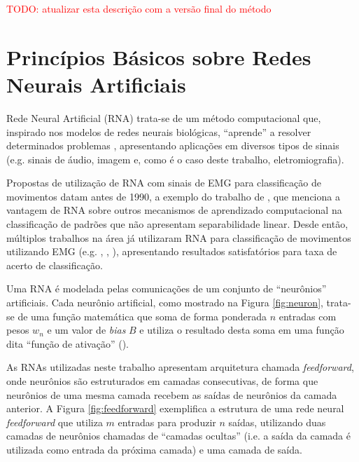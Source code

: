 

\textcolor{red}{TODO: atualizar esta descrição com a versão final do método}

		\section{Princípios Básicos sobre Redes Neurais Artificiais}
Rede Neural Artificial (RNA) trata-se de um método computacional que, inspirado nos modelos de redes neurais biológicas, ``aprende'' a resolver determinados problemas \cite{yegnanarayana2009artificial}, apresentando aplicações em diversos tipos de sinais (e.g. sinais de áudio, imagem e, como é o caso deste trabalho, eletromiografia).

Propostas de utilização de RNA com sinais de EMG para classificação de movimentos datam antes de 1990, a exemplo do trabalho de \cite{Hiraiwa1989}, que menciona a vantagem de RNA sobre outros mecanismos de aprendizado computacional na classificação de padrões que não apresentam separabilidade linear. Desde então, múltiplos trabalhos na área já utilizaram RNA para classificação de movimentos utilizando EMG (e.g. \cite{Hudgins1993}, \cite{Subasi2006}, \cite{Bu2003}), apresentando resultados satisfatórios para taxa de acerto de classificação.

Uma RNA é modelada pelas comunicações de um conjunto de ``neurônios'' artificiais. Cada neurônio artificial, como mostrado na Figura \ref{fig:neuron}, trata-se de uma função matemática que soma de forma ponderada $n$ entradas com pesos $w_n$ e um valor de \emph{bias} $B$ e utiliza o resultado desta soma em uma função dita ``função de ativação'' (\cite{Tanikic2012}).



As RNAs utilizadas neste trabalho apresentam arquitetura chamada \emph{feedforward}, onde neurônios são estruturados em camadas consecutivas, de forma que neurônios de uma mesma camada recebem as saídas de neurônios da camada anterior. A Figura \ref{fig:feedforward} exemplifica a estrutura de uma rede neural \emph{feedforward} que utiliza $m$ entradas para produzir $n$ saídas, utilizando duas camadas de neurônios chamadas de ``camadas ocultas'' (i.e. a saída da camada é utilizada como entrada da próxima camada) e uma camada de saída.



